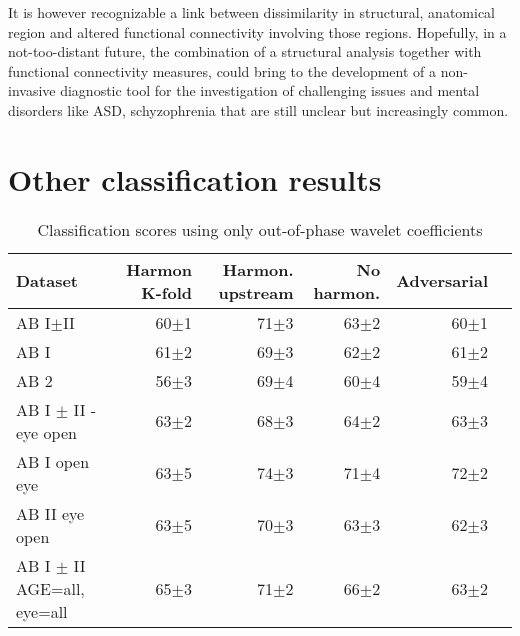 \documentclass[11pt]{report}
\begin{document}
It is however recognizable a link between dissimilarity in structural, anatomical region and altered functional connectivity involving those regions.
Hopefully, in a not-too-distant future, the combination of a structural analysis together with functional connectivity measures, could bring to the development of a non-invasive diagnostic tool for the investigation of challenging issues and mental disorders like ASD, schyzophrenia that are still unclear but increasingly common.






\newpage


\appendix


\chapter{Other classification results}

\begin{table}[!htp]\centering
\scriptsize
\begin{tabular}{lrrrrr}\toprule
Dataset &Harmon K-fold &Harmon. upstream &No harmon. &Adversarial \\\midrule
AB I$\pm$II &60$\pm$1 &71$\pm$3 &63$\pm$2 &60$\pm$1 \\
AB I &61$\pm$2 &69$\pm$3 &62$\pm$2 &61$\pm$2 \\
AB 2 &56$\pm$3 &69$\pm$4 &60$\pm$4 &59$\pm$4 \\
AB I $\pm$ II - eye open &63$\pm$2 &68$\pm$3 &64$\pm$2 &63$\pm$3 \\
AB I open eye &63$\pm$5 &74$\pm$3 &71$\pm$4 &72$\pm$2 \\
AB II eye open &63$\pm$5 &70$\pm$3 &63$\pm$3 &62$\pm$3 \\
AB I $\pm$ II AGE=all, eye=all &65$\pm$3 &71$\pm$2 &66$\pm$2 &63$\pm$2 \\
\bottomrule
\end{tabular}
\caption{Classification scores using only out-of-phase wavelet coefficients}
\label{tab:classification_wout}
\end{table}
\end{document}
